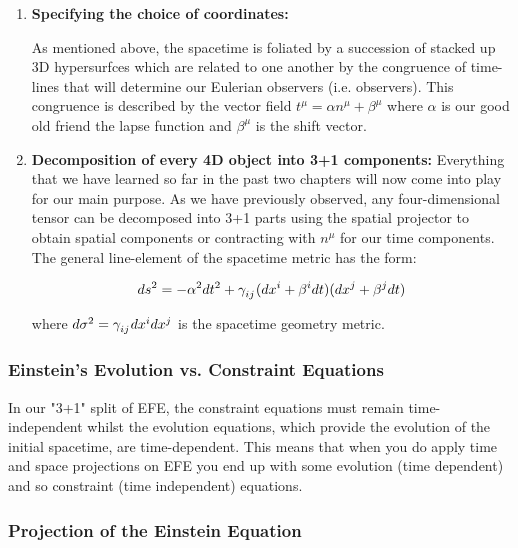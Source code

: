 \documentclass[12pt]{article}
\numberwithin{equation}{section}
\numberwithin{theorem}{subsection}
\begin{document}
\begin{enumerate}

    \item \textbf{Specifying the choice of coordinates:} 

    As mentioned above, the spacetime is foliated by a succession of stacked up 3D hypersurfces which are related to one another by the congruence of time-lines that will determine our Eulerian observers (i.e. observers). This congruence is described by the vector field $t^{\mu} = \alpha n^{\mu} + \beta^{\mu}$ where $\alpha$ is our good old friend the lapse function and $\beta^{\mu}$ is the shift vector.

    \item \textbf{Decomposition of every 4D object into 3+1 components:} Everything that we have learned so far in the past two chapters will now come into play for our main purpose. As we have previously observed, any four-dimensional tensor can be decomposed into 3+1 parts using the spatial projector to obtain spatial components or contracting with $n^{\mu}$ for our time components. \newline The general line-element of the spacetime metric has the form:

    \begin{equation*}

        ds^{2} = -\alpha^{2}dt^{2} + \tensor{\gamma}{_i_j}(dx^{i}+\beta^{i}dt)(dx^{j}+\beta^{j}dt)

    \end{equation*}

    where $d\sigma^{2}=\tensor{\gamma}{_i_j}dx^{i}dx^{j}$ is the spacetime geometry metric.

\end{enumerate}

\subsubsection{Einstein's Evolution vs. Constraint Equations}

In our "3+1" split of EFE, the constraint equations must remain time-independent whilst the evolution equations, which provide the evolution of the initial spacetime, are time-dependent. This means that when you do apply time and space projections on EFE you end up with some evolution (time dependent) and so constraint (time independent) equations.

\subsubsection{Projection of the Einstein Equation}
\end{document}
